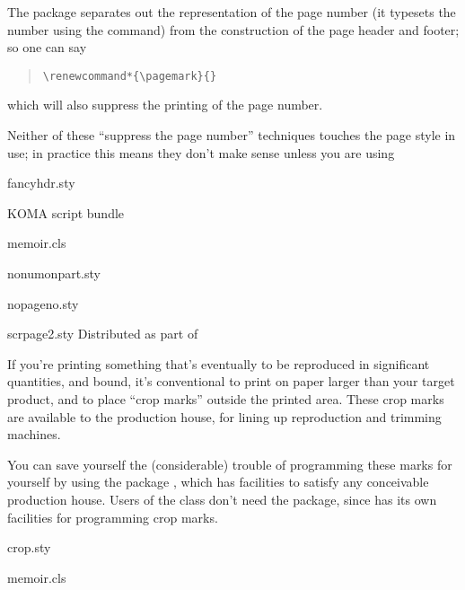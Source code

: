 The  package separates out the representation of the
page number (it typesets the number using the  command) from
the construction of the page header and footer; so one can say
\begin{quote}
\begin{verbatim}
\renewcommand*{\pagemark}{}
\end{verbatim}
\end{quote}
which will also suppress the printing of the page number.

Neither of these ``suppress the page number'' techniques touches the
page style in use; in practice this means they don't make sense unless
you are using 
\begin{ctanrefs}
\item[fancyhdr.sty]
\item[\nothtml{\rmfamily}KOMA script bundle]
\item[memoir.cls]
\item[nonumonpart.sty]
\item[nopageno.sty]
\item[scrpage2.sty]Distributed as part of 
\end{ctanrefs}


If you're printing something that's eventually to be reproduced in
significant quantities, and bound, it's conventional to print on paper
larger than your target product, and to place ``crop marks'' outside
the printed area.  These crop marks are available to the production
house, for lining up reproduction and trimming machines.

You can save yourself the (considerable) trouble of programming these
marks for yourself by using the package , which has
facilities to satisfy any conceivable production house.  Users of the
 class don't need the package, since  has
its own facilities for programming crop marks.
\begin{ctanrefs}
\item[crop.sty]
\item[memoir.cls]
\end{ctanrefs}


